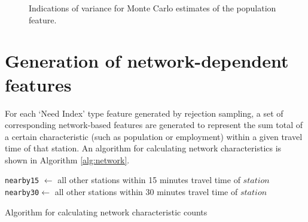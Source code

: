 \documentclass[11pt]{report}
\begin{document}
\begin{figure}[H]
\centering
{}
\caption{Indications of variance for Monte Carlo estimates of the population feature.}\label{fig:mcvar}
\end{figure}

\section{Generation of network-dependent features}\label{sec:net}

For each `Need Index' type feature generated by rejection sampling, a set of corresponding network-based features are generated to represent the sum total of a certain characteristic (such as population or employment) within a given travel time of that station. An algorithm for calculating network characteristics is shown in Algorithm \ref{alg:network}. 

\begin{algorithm}
\begin{algorithmic}
	\State\texttt{nearby15} $\gets$ all other stations within 15 minutes travel time of $station$
	\State \texttt{nearby30}$ \gets$ all other stations within 30 minutes travel time of $station$
		\EndFor
		\EndFor
	\EndFor
\EndFor
\end{algorithmic}\caption{Algorithm for calculating network characteristic counts}\label{alg:network}
\end{algorithm}
\end{document}
